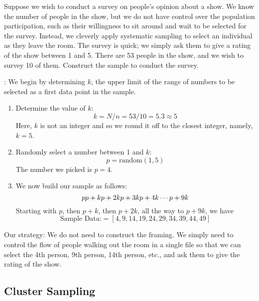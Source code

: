 \begin{example}  \label{sys-sampling-002}
Suppose we wish to conduct a survey on people's opinion about a show. We know the number of people in the show, but we do not have control over the population participation, such as their willingness to sit around and wait to be selected for the survey. Instead, we cleverly apply systematic sampling to select an individual as they leave the room. The survey is quick; we simply ask them to give a rating of the show between 1 and 5. There are 53 people in the show, and we wish to survey 10 of them. Construct the sample to conduct the survey. 

: We begin by determining $k$, the upper limit of the range of numbers to be selected as a first data point in the sample.  
\begin{enumerate}
\item Determine the value of $k$:
\[ k = N/n = 53/10 = 5.3 \approx 5 \]  
Here, $k$ is not an integer and so we round it off to the closest integer, namely, $k=5$. 
\item Randomly select a number between 1 and $k$:
\[ p = {\text{random}}(1,5) \]
The number we picked is $p=4$. 
\item We now build our sample as follows: 
\[ 
p \\
p + k \\
p + 2k \\
p + 3k \\
p + 4k \\
\cdots \\
p + 9k 
\]
Starting with $p$, then $p+k$, then $p + 2k$, all the way to $p + 9k$, we have
\[ 
   {\text{Sample Data:}} = [ 4, 9, 14, 19, 24, 29, 34, 39, 44, 49 ]
\]
\end{enumerate}
Our strategy: We do not need to construct the framing. We simply need to control the flow of people walking out the room in a single file so that we can select the 4th person, 9th person, 14th person, etc., and ask them to give the rating of the show.      
\end{example} 

\subsection{Cluster Sampling}

